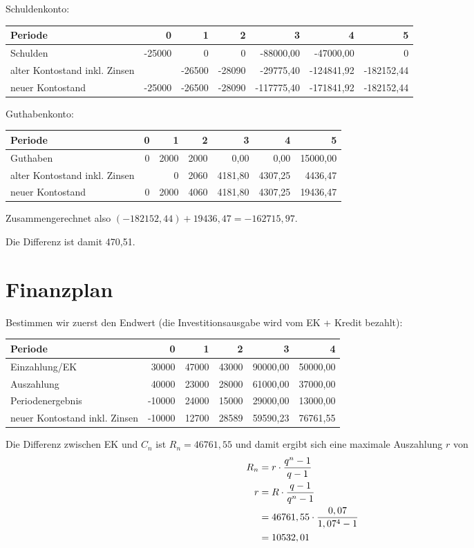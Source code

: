 \documentclass{article}
\begin{document}
	Schuldenkonto:
	\begin{center}
		\begin{tabular}{l|r|r|r|r|r|r}
			Periode & 0 & 1 & 2 & 3 & 4 & 5 \\
			\hline
			Schulden & -25000 & 0 & 0 & -88000,00 & -47000,00 & 0 \\
			\hline
			alter Kontostand inkl. Zinsen & & -26500 & -28090 & -29775,40 & -124841,92 & -182152,44 \\
			\hline
			neuer Kontostand & -25000 & -26500 & -28090 & -117775,40 & -171841,92 & -182152,44
		\end{tabular}
	\end{center}
	Guthabenkonto:
	\begin{center}
		\begin{tabular}{l|r|r|r|r|r|r}
			Periode & 0 & 1 & 2 & 3 & 4 & 5 \\
			\hline
			Guthaben & 0 & 2000 & 2000 & 0,00 & 0,00 & 15000,00 \\
			\hline
			alter Kontostand inkl. Zinsen & & 0 & 2060 & 4181,80 & 4307,25 & 4436,47 \\
			\hline
			neuer Kontostand & 0 & 2000 & 4060 & 4181,80 & 4307,25 & 19436,47
		\end{tabular}
	\end{center}
	Zusammengerechnet also $(-182152,44) + 19436,47 = -162715,97$.
	
	Die Differenz ist damit 470,51.
	
	\section*{Finanzplan}
	Bestimmen wir zuerst den Endwert (die Investitionsausgabe wird vom EK + Kredit bezahlt):
	\begin{center}
		\begin{tabular}{l|r|r|r|r|r}
			Periode & 0 & 1 & 2 & 3 & 4 \\
			\hline
			Einzahlung/EK & 30000 & 47000 & 43000 & 90000,00 & 50000,00 \\
			\hline
			Auszahlung & 40000 & 23000 & 28000 & 61000,00 & 37000,00 \\
			\hline
			Periodenergebnis & -10000 & 24000 & 15000 & 29000,00 & 13000,00 \\
			\hline
			neuer Kontostand inkl. Zinsen & -10000 & 12700 & 28589 & 59590,23 & 76761,55
		\end{tabular}
	\end{center}
	Die Differenz zwischen EK und $C_n$ ist $R_n = 46761,55$ und damit ergibt sich eine maximale Auszahlung $r$ von
	\begin{align}
		R_n &= r \cdot \frac{q^n - 1}{q-1} \notag \\
		r &= R \cdot \frac{q-1}{q^n-1} \notag \\
		&= 46761,55 \cdot \frac{0,07}{1,07^4-1} \notag \\
		&= 10532,01 \notag
	\end{align}
\end{document}

